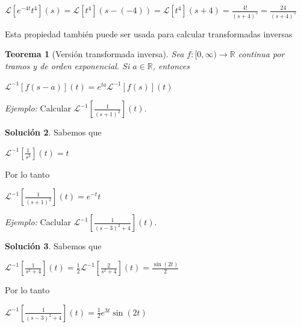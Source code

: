 \documentclass{article}
\theoremstyle{plain}
\newtheorem{thm}{Teorema}[section]
\theoremstyle{definition}
\newtheorem{sol}[thm]{Solución}
\begin{document}
\begin{center}
$\displaystyle \mathcal{L}[e^{-4t}t^4](s) = \mathcal{L}[t^4](s-(-4)) = \mathcal{L}[t^4](s+4) = \frac{4!}{(s+4)^5}= \frac{24}{(s+4)^5}$
\end{center}

Esta propiedad también puede ser usada para calcular transformadas inversas \\

\begin{thm}[Versión transformada inversa]Sea $f: [0,\infty) \to \mathbb{R}$ continua por tramos y de orden exponencial. Si $a\in \mathbb{R}$, entonces
\end{thm}

\begin{center}
$\displaystyle \mathcal{L}^{-1}[f(s-a)](t) = e^{ta}\mathcal{L}^{-1}[f(s)](t)$
\end{center}


\textit{Ejemplo:} Calcular $\displaystyle \mathcal{L}^{-1} \left[ \frac{1}{(s+1)^2} \right](t)$. \\

\begin{sol}Sabemos que
\end{sol}


\begin{center}
$\displaystyle \mathcal{L}^{-1} \left[ \frac{1}{s^2} \right](t) = t$
\end{center}

Por lo tanto

\begin{center}
$\displaystyle \mathcal{L}^{-1} \left[ \frac{1}{(s+1)^2} \right](t) = e^{-t}t$
\end{center}



\textit{Ejemplo:} Caclular $\displaystyle \mathcal{L}^{-1} \left[ \frac{1}{(s-3)^2+4} \right](t)$. \\

\begin{sol}Sabemos que
\end{sol}


\begin{center}
$\displaystyle \mathcal{L}^{-1} \left[ \frac{1}{s^2+4} \right](t) = \frac{1}{2} \mathcal{L}^{-1} \left[ \frac{2}{s^2+4} \right](t) = \frac{\sin(2t)}{2}$
\end{center}

Por lo tanto

\begin{center}
$\displaystyle \mathcal{L}^{-1} \left[ \frac{1}{(s-3)^2+4} \right](t) = \frac{1}{2} e^{3t}\sin(2t)$
\end{center}
\end{document}
